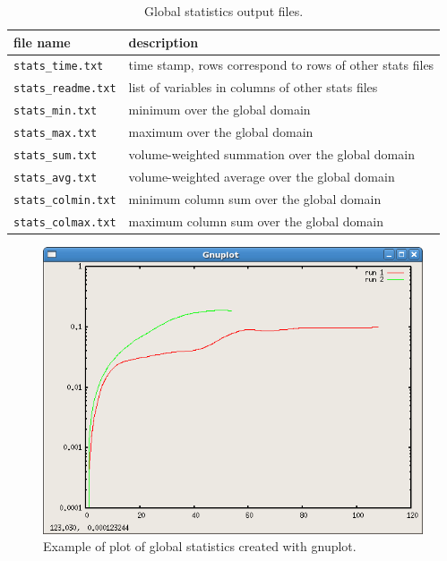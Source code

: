 \begin{table}[ht] 
\caption{Global statistics output files.}
\vspace{0.5cm} \centering 
\begin{tabular}{ll} 
\hline\hline file name & description  \\
\hline 
\verb|stats_time.txt| & time stamp, rows correspond to rows of other stats files \\
\verb|stats_readme.txt| & list of variables in columns of other stats files \\
\verb|stats_min.txt| & minimum over the global domain \\
\verb|stats_max.txt| & maximum over the global domain \\
\verb|stats_sum.txt| & volume-weighted summation over the global domain \\
\verb|stats_avg.txt| & volume-weighted average over the global domain \\
\verb|stats_colmin.txt| & minimum column sum over the global domain \\
\verb|stats_colmax.txt| & maximum column sum over the global domain \\
\hline 
\end{tabular} \label{oceanTable:global statistics} 
\end{table}

\begin{figure}[H!]
	\centering
	\includegraphics[scale=0.5]{ocean/figures/gnuplot.png}
	\caption{Example of plot of global statistics created with gnuplot.}
	\label{fig:gnuplot}
\end{figure}
